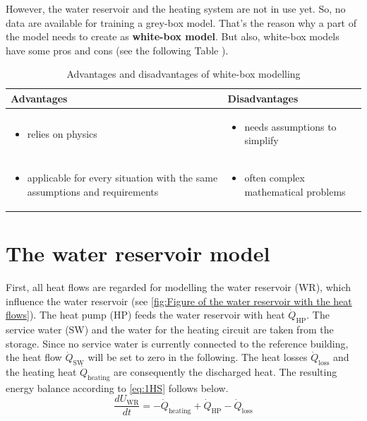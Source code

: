     \newline
    However, the water reservoir and the heating system are not in use yet. So, no data are available for training a grey-box model. That's the reason why a part of the model needs to create as \textbf{white-box model}.
    \newline
    But also, white-box models have some pros and cons (see the following Table \cite{EstradaFlores.2006}).
    \begin{table}[]
    \label{tab:wihte-boxpro}
        \centering
        \begin{tabular}{p{7.3cm} | p{7.3cm}}
        \hline
          Advantages  &  Disadvantages\\
        \hline
        \begin{itemize}
            \item relies on physics
        \end{itemize}
      & \begin{itemize}
            \item needs assumptions to simplify 
        \end{itemize}\\
     \begin{itemize}
            \item applicable for every situation with the same assumptions and requirements 
        \end{itemize} & \begin{itemize}
            \item often complex mathematical problems
        \end{itemize}\\
        \end{tabular}
        \caption {Advantages and disadvantages of white-box modelling}
    \end{table}


    \section{The water reservoir model}
    \label{waterModel}
    First, all heat flows are regarded for modelling the water reservoir (WR), which influence the water reservoir (see \autoref{fig:Figure of the water reservoir with the heat flows}). The heat pump (HP) feeds the water reservoir with heat $\dot{Q}_\text{HP}$. The service water (SW) and the water for the heating circuit are taken from the storage. Since no service water is currently connected to the reference building, the heat flow $\dot{Q}_\text{SW}$ will be set to zero in the following. The heat losses $\dot{Q}_\text{loss}$ and the heating heat $\dot{Q}_\text{heating}$ are consequently the discharged heat. The resulting energy balance according to \autoref{eq:1HS} follows below.
    \begin{equation}
        \label{waterReservoir}
        \frac{d U_\text{WR}}{d t}= -\dot{Q}_\text{heating} + \dot{Q}_\text{HP} - \dot{Q}_\text{loss}
    \end{equation}
    
